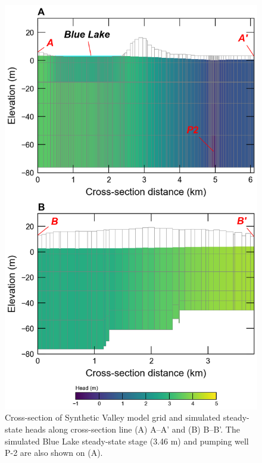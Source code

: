 \documentclass[11pt, oneside]{article}  	%
\begin{document}
\begin{figure}[ht!]
	\begin{center}
		\includegraphics{figures/mv_voronoi_xsection.png}
	\end{center}
	\caption{Cross-section of Synthetic Valley model grid and simulated steady-state heads along cross-section line (A) A--A' and (B) B--B'. The simulated Blue Lake steady-state stage (3.46 m) and pumping well P-2 are also shown on (A).}
	\label{fig:mvxsection}
\end{figure}
\end{document}
